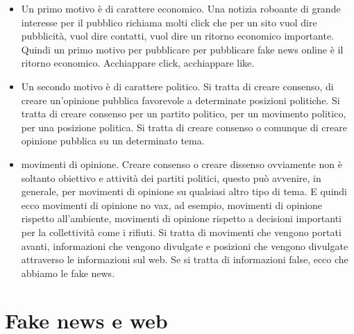 \begin{itemize}
    \item Un primo motivo è di carattere economico. Una notizia roboante di grande interesse per il pubblico richiama molti click che per un sito vuol dire pubblicità, vuol dire contatti, vuol dire  un ritorno economico importante. Quindi un primo motivo per pubblicare per pubblicare fake news online è il ritorno economico. Acchiappare click, acchiappare like. 
    \item Un secondo motivo è di carattere politico. Si tratta di creare consenso, di creare un'opinione pubblica favorevole a determinate posizioni politiche. Si tratta di creare consenso per un partito politico, per un movimento politico, per una posizione politica. Si tratta di creare consenso o comunque di creare opinione pubblica su un determinato tema.
    \item movimenti di opinione. Creare consenso o creare dissenso ovviamente non è soltanto obiettivo e attività dei partiti politici, questo può avvenire, in generale, per movimenti di opinione su qualsiasi altro tipo di tema. E quindi ecco movimenti di opinione no vax, ad esempio, movimenti di opinione rispetto all'ambiente, movimenti di opinione rispetto a decisioni importanti per la collettività come i rifiuti. Si tratta di movimenti che vengono portati avanti, informazioni che vengono divulgate e posizioni che vengono divulgate attraverso le informazioni sul web. Se si tratta di informazioni false, ecco che abbiamo le fake news.
\end{itemize}  

\section{Fake news e web}

